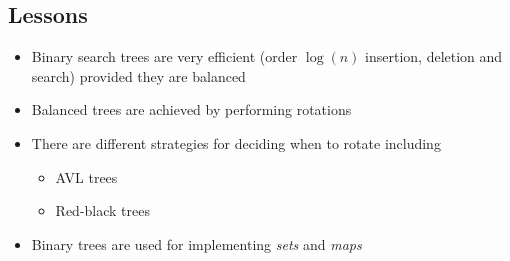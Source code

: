 
\begin{slide}
\section{Lessons}

\begin{PauseHighLight}
  \begin{itemize}
  \item Binary search trees are very efficient (order $\log(n)$
    insertion, deletion and search) provided they are balanced\pause
  \item Balanced trees are achieved by performing rotations\pause
  \item There are different strategies for deciding when to rotate
    including
    \begin{itemize}
    \item AVL trees
    \item Red-black trees\pause
    \end{itemize}
  \item Binary trees are used for implementing \emph{sets} and
    \emph{maps}\pause
  \end{itemize}
\end{PauseHighLight}

\end{slide}

